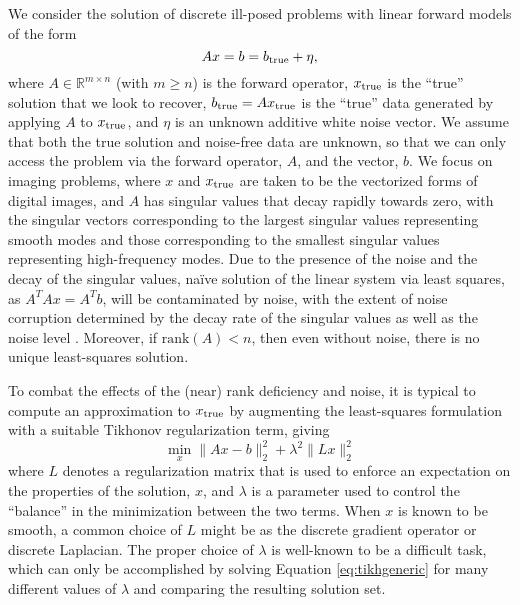 We consider the solution of discrete ill-posed problems with linear
forward models of the form
\begin{equation}
\label{eq:exact}
A x = b = b_{\mathrm{true}} + \eta,
\end{equation}
where $A \in \mathbb{R}^{m\times n}$ (with $m \geq n$) is the forward
operator, $x_{\mathrm{true}}$ is the ``true'' solution that we look to recover,
$b_{\mathrm{true}} = Ax_{\mathrm{true}}$ is the ``true'' data generated by applying $A$
to $x_{\mathrm{true}}$, and $\eta$ is an unknown additive white noise vector.  We
assume that both the true solution and noise-free data are unknown, so
that we can only access the problem via the forward operator, $A$, and
the vector, $b$.  We focus on imaging problems, where $x$ and
$x_{\mathrm{true}}$ are taken to be the vectorized forms of digital images, and
$A$ has singular values that decay rapidly towards zero, with the
singular vectors corresponding to the largest singular values
representing smooth modes and those corresponding to the smallest
singular values representing high-frequency modes.  Due to the
presence of the noise and the decay of the singular values, na\"ive
solution of the linear system via least squares, as $A^TA x = A^Tb$,
will be contaminated by noise, with the extent of noise corruption
determined by the decay rate of the singular values as well as the
noise level \cite{Hansenbk}.  Moreover, if $\text{rank}(A)< n$, then
even without noise, there is no unique least-squares solution.

To combat the effects of the (near) rank deficiency and noise, it is typical to
compute an approximation to $x_{\mathrm{true}}$ by augmenting the least-squares
formulation with a suitable
Tikhonov regularization \cite{Tikhonov} term, giving
\begin{equation}
\label{eq:tikhgeneric}
\min_{x} \| A x - b \|_2^2 + \lambda^2 \| L x \|_2^2
\end{equation}
where $L$ denotes a regularization matrix that is used to enforce an
expectation on the properties of the solution, $x$, and $\lambda$ is a
parameter used to control the ``balance'' in the minimization between
the two terms.  When $x$ is known to be smooth, a common choice of $L$
might be as the discrete gradient operator or discrete
Laplacian.  The proper choice of $\lambda$ is well-known to be a difficult task,
which can only be accomplished by solving
Equation \eqref{eq:tikhgeneric} for many different values of $\lambda$
and comparing the resulting solution set.

